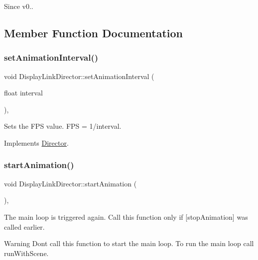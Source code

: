\begin{DoxySince}{Since}
v0.. 
\end{DoxySince}


\subsection{Member Function Documentation}
\mbox{\label{classDisplayLinkDirector_ab433b1840297793f0723d673f8efea14}} 
\subsubsection{\texorpdfstring{set\+Animation\+Interval()}{setAnimationInterval()}}
{\footnotesize\ttfamily void Display\+Link\+Director\+::set\+Animation\+Interval (\begin{DoxyParamCaption}\item[{float}]{interval }\end{DoxyParamCaption})\hspace{0.3cm}{\ttfamily [override]}, {\ttfamily [virtual]}}

Sets the F\+PS value. F\+PS = 1/interval. 

Implements \hyperlink{classDirector_a87d84ea16dfb7c991a4fcfd48e8d22ed}{Director}.

\mbox{\label{classDisplayLinkDirector_aed0e316ca8afa0b6e155a5257e3f9201}} 
\subsubsection{\texorpdfstring{start\+Animation()}{startAnimation()}}
{\footnotesize\ttfamily void Display\+Link\+Director\+::start\+Animation (\begin{DoxyParamCaption}{ }\end{DoxyParamCaption})\hspace{0.3cm}{\ttfamily [override]}, {\ttfamily [virtual]}}

The main loop is triggered again. Call this function only if \mbox{[}stop\+Animation\mbox{]} was called earlier. \begin{DoxyWarning}{Warning}
Don\textquotesingle{}t call this function to start the main loop. To run the main loop call run\+With\+Scene. 
\end{DoxyWarning}


